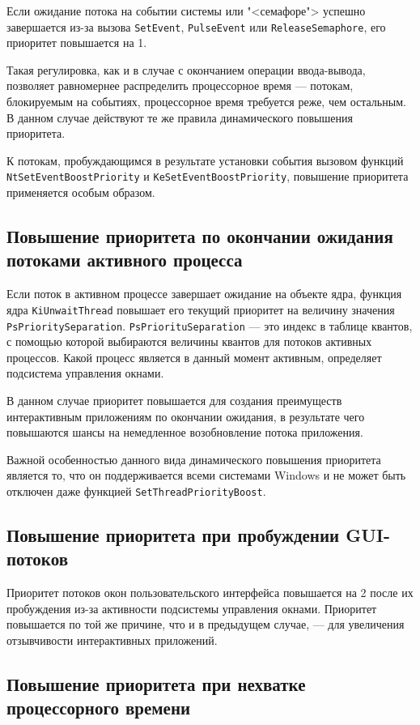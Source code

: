 \documentclass[a4paper,oneside,14pt]{extreport}
\newcommand{\code}[1]{\texttt{#1}}
\begin{document}
Если ожидание потока на событии системы или "<семафоре"> успешно завершается из-за вызова \code{SetEvent}, \code{PulseEvent} или \code{ReleaseSemaphore}, его приоритет повышается на 1.

Такая регулировка, как и в случае с окончанием операции ввода-вывода, позволяет равномернее распределить процессорное время --- потокам, блокируемым на событиях, процессорное время требуется реже, чем остальным. В данном случае действуют те же правила динамического повышения приоритета.

К потокам, пробуждающимся в результате установки события вызовом функций \code{NtSetEventBoostPriority} и \code{KeSetEventBoostPriority}, повышение приоритета применяется особым образом.

\subsection{Повышение приоритета по окончании ожидания потоками активного процесса}

Если поток в активном процессе завершает ожидание на объекте ядра, функция ядра \code{KiUnwaitThread} повышает его текущий приоритет на величину значения \code{PsPrioritySeparation}. \code{PsPriorituSeparation} --- это индекс в таблице квантов, с помощью которой выбираются величины квантов для потоков активных процессов. Какой процесс является в данный момент активным, определяет подсистема управления окнами.

В данном случае приоритет повышается для создания преимуществ интерактивным приложениям по окончании ожидания, в результате чего повышаются шансы на немедленное возобновление потока приложения.

Важной особенностью данного вида динамического повышения приоритета является то, что он поддерживается всеми системами Windows и не может быть отключен даже функцией \code{SetThreadPriorityBoost}.

\subsection{Повышение приоритета при пробуждении GUI-потоков}

Приоритет потоков окон пользовательского интерфейса повышается на 2 после их пробуждения из-за активности подсистемы управления окнами. Приоритет повышается по той же причине, что и в предыдущем случае, --- для увеличения отзывчивости интерактивных приложений.

\subsection{Повышение приоритета при нехватке процессорного времени}
\end{document}
